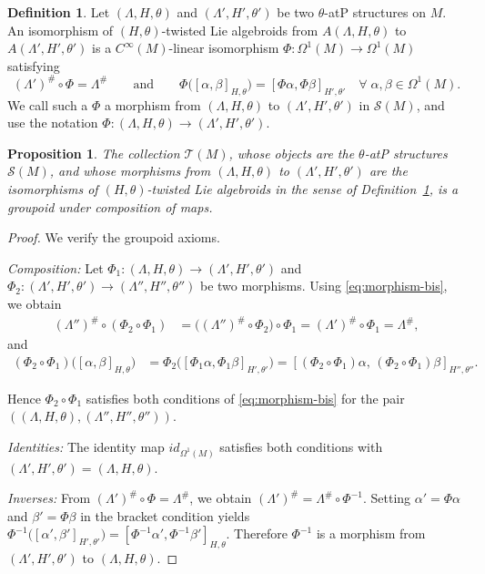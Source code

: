 \documentclass[11pt,a4paper]{article}
\theoremstyle{plain}
\newtheorem{proposition}[theorem]{Proposition}
\theoremstyle{definition}
\newtheorem{definition}[theorem]{Definition}
\theoremstyle{remark}
\begin{document}
\begin{definition}\label{def:morphism}
Let $(\Lambda, H, \theta)$ and $(\Lambda', H', \theta')$ be two $\theta$-atP
structures on $M$. An isomorphism of $(H,\theta)$-twisted Lie
algebroids from $A(\Lambda, H, \theta)$ to $A(\Lambda', H', \theta')$ is a
$C^\infty(M)$-linear isomorphism $\Phi : \Omega^1(M) \to \Omega^1(M)$ satisfying
\begin{equation}\label{eq:morphism-bis}
  (\Lambda')^\# \circ \Phi = \Lambda^\#
  \qquad\text{and}\qquad
  \Phi\bigl([\alpha,\beta]_{H,\theta}\bigr)
  = [\Phi\alpha,\Phi\beta]_{H',\theta'}
  \quad \forall\;\alpha,\beta \in \Omega^1(M).
\end{equation}
We call such  a $\Phi$  a morphism from $(\Lambda,H,\theta)$ to
$(\Lambda',H',\theta')$  in $\mathcal{S}(M)$, and use the notation
$\Phi : (\Lambda,H,\theta) \to (\Lambda',H',\theta')$.
\end{definition}

\begin{proposition}\label{thm:groupoid}
	The collection $\mathcal{T}(M)$, whose objects are the $\theta$-atP structures $\mathcal{S}(M)$,
	and whose morphisms from $(\Lambda,H,\theta)$ to $(\Lambda',H',\theta')$
	are the isomorphisms of $(H,\theta)$-twisted Lie algebroids in the sense of
	Definition~\ref{def:morphism},
	is a groupoid under composition of maps.
\end{proposition}

\begin{proof}
	We verify the groupoid axioms.\smallskip
	
	\emph{Composition:}
	Let
	$\Phi_1 : (\Lambda,H,\theta) \to (\Lambda',H',\theta')$
	and
	$\Phi_2 : (\Lambda',H',\theta') \to (\Lambda'',H'',\theta'')$
	be two morphisms.
	Using \eqref{eq:morphism-bis}, we obtain
\begin{align*}
   (\Lambda'')^\# \circ (\Phi_2 \circ \Phi_1)
   &= \bigl((\Lambda'')^\# \circ \Phi_2\bigr) \circ \Phi_1
   = (\Lambda')^\# \circ \Phi_1 = \Lambda^\#,
   \end{align*}
   and
   \begin{align*}
   (\Phi_2 \circ \Phi_1)\bigl([\alpha,\beta]_{H,\theta}\bigr)
   &= \Phi_2\bigl([\Phi_1\alpha, \Phi_1\beta]_{H',\theta'}\bigr)
   = [(\Phi_2\circ\Phi_1)\alpha,\, (\Phi_2\circ\Phi_1)\beta]_{H'',\theta''}.
\end{align*}

Hence $\Phi_2\circ\Phi_1$ satisfies both conditions of \eqref{eq:morphism-bis}
for the pair
$((\Lambda,H,\theta),(\Lambda'',H'',\theta''))$.

\emph{Identities:}
The identity map $id_{\Omega^1(M)}$ satisfies both conditions with
$(\Lambda',H',\theta')=(\Lambda,H,\theta)$.

\emph{Inverses:}
From $(\Lambda')^\#\circ\Phi=\Lambda^\#$, we obtain
$(\Lambda')^\#=\Lambda^\#\circ\Phi^{-1}$.
Setting $\alpha'=\Phi\alpha$ and $\beta'=\Phi\beta$ in the bracket condition yields
$\Phi^{-1}\bigl([\alpha',\beta']_{H',\theta'}\bigr)
=
[\Phi^{-1}\alpha',\Phi^{-1}\beta']_{H,\theta}$.
Therefore $\Phi^{-1}$ is a morphism from $(\Lambda',H',\theta')$ to $(\Lambda,H,\theta)$.
\end{proof}
\end{document}
